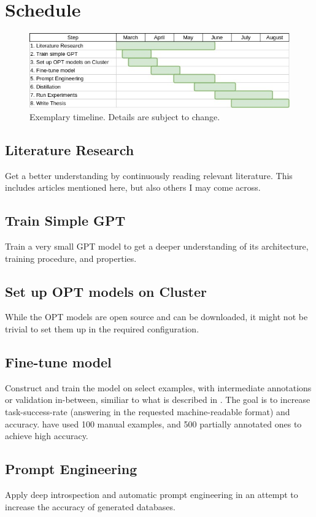 \documentclass[a4paper,12pt]{article}
\begin{document}
\section{Schedule}
\begin{figure}[ht!]
    \includegraphics[width=\textwidth]{img/thesis_gantt}
    \caption{Exemplary timeline. Details are subject to change.}
\end{figure}

\subsection{Literature Research}
Get a better understanding by continuously reading relevant literature. This
includes articles mentioned here, but also others I may come across.

\subsection{Train Simple GPT}
Train a very small GPT model to get a deeper understanding of its architecture,
training procedure, and properties.

\subsection{Set up OPT models on Cluster}
While the OPT models are open source and can be downloaded, it might not be
trivial to set them up in the required configuration.

\subsection{Fine-tune model}
Construct and train the model on select examples, with intermediate annotations
or validation in-between, similiar to what is described in
\cite{dunn_structured_2022}. The goal is to increase task-success-rate
(answering in the requested machine-readable format) and accuracy.
\cite{dunn_structured_2022} have used 100 manual examples, and 500 partially
annotated ones to achieve high accuracy.

\subsection{Prompt Engineering}
Apply deep introspection and automatic prompt engineering \cite{zhou_large_2022}
in an attempt to increase the accuracy of generated databases.
\end{document}
